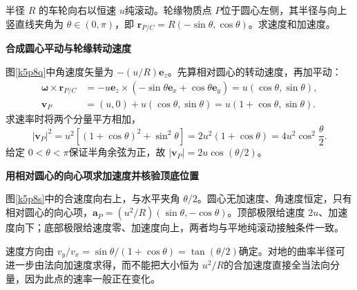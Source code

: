 \begin{question}\begin{example}[纯滚动车轮轮缘点]\label{k5p8}
半径 $R$ 的车轮向右以恒速 $u$纯滚动。轮缘物质点 $P$位于圆心左侧，其半径与向上竖直线夹角为 $\theta\in(0,\pi)$，即 $\bm r_{P/C}=R(-\sin\theta,\cos\theta)$。求速度和加速度。\end{example}
\end{question}
\begin{solution}\textbf{合成圆心平动与轮缘转动速度}\par\nobreak
图\ref{k5p8q}中角速度矢量为 $-(u/R)\bm e_z$。先算相对圆心的转动速度，再加平动：
\begin{align*}
 \bm\omega\times\bm r_{P/C}
 &=-u\bm e_z\times(-\sin\theta\bm e_x+\cos\theta\bm e_y)
 =u(\cos\theta,\sin\theta),\\
 \bm v_P&=(u,0)+u(\cos\theta,\sin\theta)
 =\boxed{u(1+\cos\theta,\sin\theta)}.
\end{align*}
求速率时将两个分量平方相加，
\[
 |\bm v_P|^2=u^2[(1+\cos\theta)^2+\sin^2\theta]
 =2u^2(1+\cos\theta)=4u^2\cos^2\frac\theta2.
\]
给定 $0<\theta<\pi$保证半角余弦为正，故 $|\bm v_P|=2u\cos(\theta/2)$。



\par\medskip{}\noindent\textbf{用相对圆心的向心项求加速度并核验顶底位置}\par\nobreak
图\ref{k5p8s}中的合速度向右上，与水平夹角 $\theta/2$。圆心无加速度、角速度恒定，只有相对圆心的向心项，$\boxed{\bm a_P=(u^2/R)(\sin\theta,-\cos\theta)}$。顶部极限给速度 $2u$、加速度向下；底部极限给速度零、加速度向上，两者均与平地纯滚动接触条件一致。

速度方向由 $v_y/v_x=\sin\theta/(1+\cos\theta)=\tan(\theta/2)$确定。对地的曲率半径可进一步由法向加速度求得，而不能把大小恒为 $u^2/R$的合加速度直接全当法向分量，因为此点的速率一般正在变化。\end{solution}

